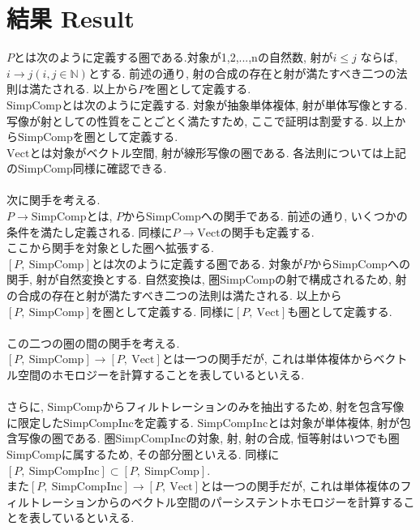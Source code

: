 \documentclass[a4paper]{jsarticle}
\theoremstyle{definition}
\newcommand{\SimpComp}{{\mathrm{SimpComp}}}
\newcommand{\Fun}[2]{[#1,~#2]}
\newcommand{\Vect}{{\mathrm{Vect}}}
\newcommand{\SimpCompInc}{{\mathrm{SimpCompInc}}}
\begin{document}
\section{結果 Result}
$P$とは次のように定義する圏である.対象が1,2,...,nの自然数, 射が$i \leq j$ ならば,  $i\rightarrow j(i, j \in \mathbb{N})$とする. 前述の通り, 射の合成の存在と射が満たすべき二つの法則は満たされる. 以上から$P$を圏として定義する. \\
$\SimpComp$とは次のように定義する. 対象が抽象単体複体, 射が単体写像とする. 写像が射としての性質をことごとく満たすため, ここで証明は割愛する. 以上から$\SimpComp$を圏として定義する.\\
$\Vect$とは対象がベクトル空間, 射が線形写像の圏である. 各法則については上記の$\SimpComp$同様に確認できる. \\
\noindent\\
次に関手を考える.\\
$P\rightarrow \SimpComp$とは, $P$から$\SimpComp$への関手である. 前述の通り, いくつかの条件を満たし定義される. 同様に$P \rightarrow \Vect$の関手も定義する. \\
ここから関手を対象とした圏へ拡張する. \\
$\Fun{P}{\SimpComp}$とは次のように定義する圏である. 対象が$P$から$\SimpComp$への関手, 射が自然変換とする. 自然変換は, 圏$\SimpComp$の射で構成されるため, 射の合成の存在と射が満たすべき二つの法則は満たされる. 以上から$\Fun{P}{\SimpComp}$を圏として定義する. 同様に$\Fun{P}{\Vect}$も圏として定義する. \\
\noindent\\
この二つの圏の間の関手を考える. \\
$\Fun{P}{\SimpComp}\rightarrow \Fun{P}{\Vect}$とは一つの関手だが, これは単体複体からベクトル空間のホモロジーを計算することを表しているといえる.\\
\noindent\\
さらに, $\SimpComp$からフィルトレーションのみを抽出するため, 射を包含写像に限定した$\SimpCompInc$を定義する. $\SimpCompInc$とは対象が単体複体, 射が包含写像の圏である. 圏SimpCompIncの対象, 射, 射の合成, 恒等射はいつでも圏SimpCompに属するため, その部分圏といえる. 同様に $\Fun{P}{\SimpCompInc}\subset \Fun{P}{\SimpComp}$.\\
また$\Fun{P}{\SimpCompInc} \rightarrow \Fun{P}{\Vect}$とは一つの関手だが, これは単体複体のフィルトレーションからのベクトル空間のパーシステントホモロジーを計算することを表しているといえる. \\
\end{document}
